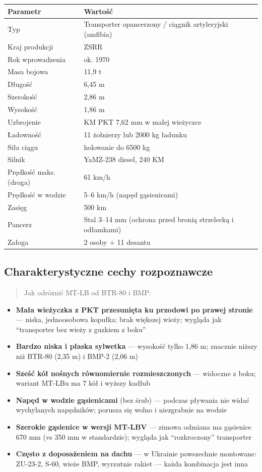 \documentclass[12pt,oneside]{book}
\providecommand{\tightlist}{%
  \setlength{\itemsep}{0pt}\setlength{\parskip}{0pt}}
\begin{document}
\begin{longtable}[]{@{}ll@{}}
\toprule\noalign{}
Parametr & Wartość \\
\midrule\noalign{}
\endhead
\bottomrule\noalign{}
\endlastfoot
Typ & Transporter opancerzony / ciągnik artyleryjski (amfibia) \\
Kraj produkcji & ZSRR \\
Rok wprowadzenia & ok. 1970 \\
Masa bojowa & 11,9 t \\
Długość & 6,45 m \\
Szerokość & 2,86 m \\
Wysokość & 1,86 m \\
Uzbrojenie & KM PKT 7,62 mm w małej wieżyczce \\
Ładowność & 11 żołnierzy lub 2000 kg ładunku \\
Siła ciągu & holowanie do 6500 kg \\
Silnik & YaMZ-238 diesel, 240 KM \\
Prędkość maks. (droga) & 61 km/h \\
Prędkość w wodzie & 5--6 km/h (napęd gąsienicami) \\
Zasięg & 500 km \\
Pancerz & Stal 3--14 mm (ochrona przed bronią strzelecką i odłamkami) \\
Załoga & 2 osoby + 11 desantu \\
\end{longtable}

\subsection{Charakterystyczne cechy
rozpoznawcze}\label{charakterystyczne-cechy-rozpoznawcze-14}

\begin{quote}
Jak odróżnić MT-LB od BTR-80 i BMP:
\end{quote}

\begin{itemize}
\tightlist
\item
  \textbf{Mała wieżyczka z PKT przesunięta ku przodowi po prawej
  stronie} --- niska, jednoosobowa kopułka; brak większej wieży; wygląda
  jak ``transporter bez wieży z guzkiem z boku''
\item
  \textbf{Bardzo niska i płaska sylwetka} --- wysokość tylko 1,86 m;
  znacznie niższy niż BTR-80 (2,35 m) i BMP-2 (2,06 m)
\item
  \textbf{Sześć kół nośnych równomiernie rozmieszczonych} --- widoczne z
  boku; wariant MT-LBu ma 7 kół i wyższy kadłub
\item
  \textbf{Napęd w wodzie gąsienicami} (bez śrub) --- podczas pływania
  nie widać wychylanych napędników; porusza się wolno i niezgrabnie na
  wodzie
\item
  \textbf{Szerokie gąsienice w wersji MT-LBV} --- zimowa odmiana ma
  gąsienice 670 mm (vs 350 mm w standardzie); wygląda jak
  ``rozkroczony'' transporter
\item
  \textbf{Często z doposażeniem na dachu} --- w Ukrainie powszechnie
  montowane: ZU-23-2, S-60, wieże BMP, wyrzutnie rakiet --- każda
  kombinacja jest inna
\end{itemize}
\end{document}
